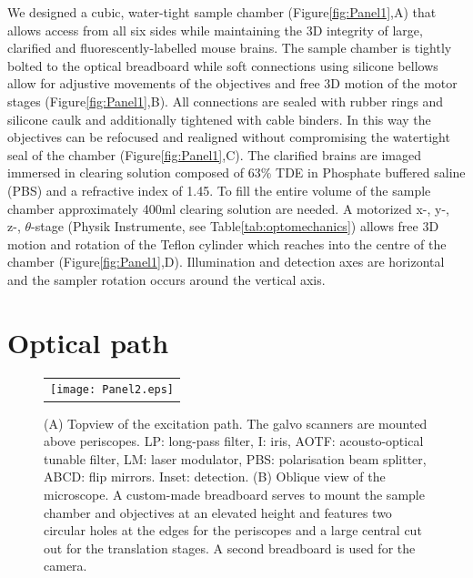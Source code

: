 \documentclass[12pt]{spieman}  %
\begin{document}
We designed a cubic, water-tight sample chamber (Figure\ref{fig:Panel1},A) that allows access from all six sides while maintaining the 3D integrity of large, clarified and fluorescently-labelled mouse brains. The sample chamber is tightly bolted  to the optical breadboard while soft connections using silicone bellows allow for adjustive movements of the objectives and free 3D motion of the motor stages (Figure\ref{fig:Panel1},B). All connections are sealed with rubber rings and silicone caulk and additionally tightened with cable binders. In this way the objectives can be refocused and realigned without compromising the watertight seal of the chamber (Figure\ref{fig:Panel1},C). The clarified brains are imaged immersed in clearing solution composed of 63\% TDE in Phosphate buffered saline (PBS) and a refractive index of 1.45. To fill the entire volume of the sample chamber approximately 400ml clearing solution are needed. A motorized x-, y-, z-, $\theta$-stage (Physik Instrumente, see Table\ref{tab:optomechanics}) allows free 3D motion and rotation of the Teflon cylinder which reaches into the centre of the chamber (Figure\ref{fig:Panel1},D). Illumination and detection axes are horizontal and the sampler rotation occurs around the vertical axis.		
		
	\section{Optical path}

		
		\begin{figure}
   \begin{center}
   \begin{tabular}{c}
   \texttt{[image: Panel2.eps]}
   \end{tabular}
   \end{center}
   \caption{\label{fig:excitation} (A) Topview of the excitation path. The galvo scanners are mounted above periscopes. LP: long-pass filter, I: iris, AOTF: acousto-optical tunable filter, LM: laser modulator, PBS: polarisation beam splitter, ABCD: flip mirrors. Inset: detection. (B) Oblique view of the microscope. A custom-made breadboard serves to mount the sample chamber and objectives at an elevated height and features two circular holes at the edges for the periscopes and a large central cut out for the translation stages. A second breadboard is used for the camera.} 
   \end{figure}
\end{document}

